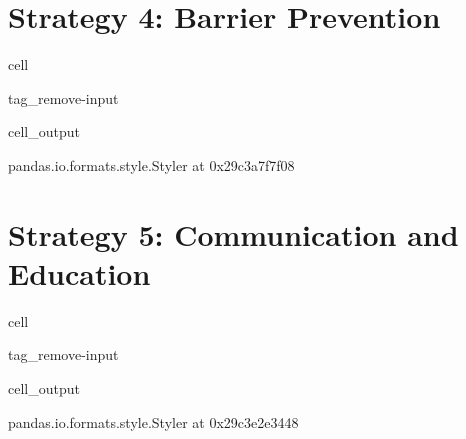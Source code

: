 \documentclass[letterpaper,10pt,english]{jupyterBook}
\begin{document}
\section{Strategy 4: Barrier Prevention}
\label{\detokenize{EcoAttributes:strategy-4-barrier-prevention}}
\begin{sphinxuseclass}{cell}
\begin{sphinxuseclass}{tag_remove-input}\begin{sphinxVerbatimOutput}

\begin{sphinxuseclass}{cell_output}
\begin{sphinxVerbatim}[commandchars=\\\{\}]
\PYGZlt{}pandas.io.formats.style.Styler at 0x29c3a7f7f08\PYGZgt{}
\end{sphinxVerbatim}

\end{sphinxuseclass}\end{sphinxVerbatimOutput}

\end{sphinxuseclass}
\end{sphinxuseclass}

\section{Strategy 5: Communication and Education}
\label{\detokenize{EcoAttributes:strategy-5-communication-and-education}}
\begin{sphinxuseclass}{cell}
\begin{sphinxuseclass}{tag_remove-input}\begin{sphinxVerbatimOutput}

\begin{sphinxuseclass}{cell_output}
\begin{sphinxVerbatim}[commandchars=\\\{\}]
\PYGZlt{}pandas.io.formats.style.Styler at 0x29c3e2e3448\PYGZgt{}
\end{sphinxVerbatim}

\end{sphinxuseclass}\end{sphinxVerbatimOutput}

\end{sphinxuseclass}
\end{sphinxuseclass}
\end{document}
